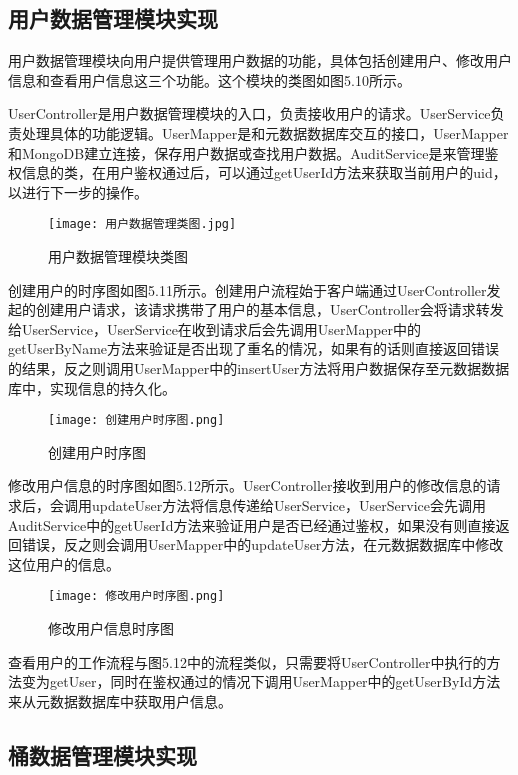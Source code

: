 \subsection{用户数据管理模块实现}
用户数据管理模块向用户提供管理用户数据的功能，具体包括创建用户、修改用户信息和查看用户信息这三个功能。这个模块的类图如图5.10所示。

UserController是用户数据管理模块的入口，负责接收用户的请求。UserService负责处理具体的功能逻辑。UserMapper是和元数据数据库交互的接口，UserMapper和MongoDB建立连接，保存用户数据或查找用户数据。AuditService是来管理鉴权信息的类，在用户鉴权通过后，可以通过getUserId方法来获取当前用户的uid，以进行下一步的操作。

\begin{figure}
  \centering
  \texttt{[image: 用户数据管理类图.jpg]}
  \caption{用户数据管理模块类图}
\end{figure}

创建用户的时序图如图5.11所示。创建用户流程始于客户端通过UserController发起的创建用户请求，该请求携带了用户的基本信息，UserController会将请求转发给UserService，UserService在收到请求后会先调用UserMapper中的getUserByName方法来验证是否出现了重名的情况，如果有的话则直接返回错误的结果，反之则调用UserMapper中的insertUser方法将用户数据保存至元数据数据库中，实现信息的持久化。

\begin{figure}
  \centering
  \texttt{[image: 创建用户时序图.png]}
  \caption{创建用户时序图}
\end{figure}

修改用户信息的时序图如图5.12所示。UserController接收到用户的修改信息的请求后，会调用updateUser方法将信息传递给UserService，UserService会先调用AuditService中的getUserId方法来验证用户是否已经通过鉴权，如果没有则直接返回错误，反之则会调用UserMapper中的updateUser方法，在元数据数据库中修改这位用户的信息。

\begin{figure}
  \centering
  \texttt{[image: 修改用户时序图.png]}
  \caption{修改用户信息时序图}
\end{figure}

查看用户的工作流程与图5.12中的流程类似，只需要将UserController中执行的方法变为getUser，同时在鉴权通过的情况下调用UserMapper中的getUserById方法来从元数据数据库中获取用户信息。

\subsection{桶数据管理模块实现}

